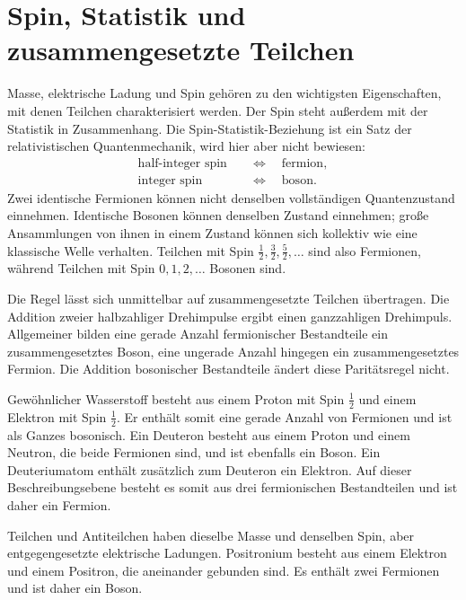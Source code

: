 \section{Spin, Statistik und zusammengesetzte Teilchen}

Masse, elektrische Ladung und Spin gehören zu den wichtigsten Eigenschaften, mit denen Teilchen charakterisiert werden. Der Spin steht außerdem mit der Statistik in Zusammenhang. Die Spin-Statistik-Beziehung ist ein Satz der relativistischen Quantenmechanik, wird hier aber nicht bewiesen:
\begin{equation}
\begin{aligned}
\text{half-integer spin} &\quad\Longleftrightarrow\quad \text{fermion},\\
\text{integer spin} &\quad\Longleftrightarrow\quad \text{boson}.
\end{aligned}
\end{equation}
Zwei identische Fermionen können nicht denselben vollständigen Quantenzustand einnehmen. Identische Bosonen können denselben Zustand einnehmen; große Ansammlungen von ihnen in einem Zustand können sich kollektiv wie eine klassische Welle verhalten. Teilchen mit Spin \(\tfrac12,\tfrac32,\tfrac52,\ldots\) sind also Fermionen, während Teilchen mit Spin \(0,1,2,\ldots\) Bosonen sind.

Die Regel lässt sich unmittelbar auf zusammengesetzte Teilchen übertragen. Die Addition zweier halbzahliger Drehimpulse ergibt einen ganzzahligen Drehimpuls. Allgemeiner bilden eine gerade Anzahl fermionischer Bestandteile ein zusammengesetztes Boson, eine ungerade Anzahl hingegen ein zusammengesetztes Fermion. Die Addition bosonischer Bestandteile ändert diese Paritätsregel nicht.

Gewöhnlicher Wasserstoff besteht aus einem Proton mit Spin \(\tfrac12\) und einem Elektron mit Spin \(\tfrac12\). Er enthält somit eine gerade Anzahl von Fermionen und ist als Ganzes bosonisch. Ein Deuteron besteht aus einem Proton und einem Neutron, die beide Fermionen sind, und ist ebenfalls ein Boson. Ein Deuteriumatom enthält zusätzlich zum Deuteron ein Elektron. Auf dieser Beschreibungsebene besteht es somit aus drei fermionischen Bestandteilen und ist daher ein Fermion.

Teilchen und Antiteilchen haben dieselbe Masse und denselben Spin, aber entgegengesetzte elektrische Ladungen. Positronium besteht aus einem Elektron und einem Positron, die aneinander gebunden sind. Es enthält zwei Fermionen und ist daher ein Boson.

